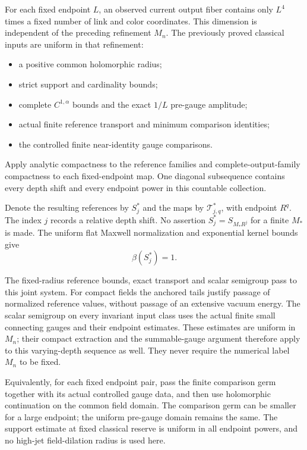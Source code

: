 For each fixed endpoint \(L\), an observed current output
fiber contains only \(L^4\) times a fixed number of link
and color coordinates. This dimension is independent of
the preceding refinement \(M_n\). The previously proved
classical inputs are uniform in that refinement:
\begin{itemize}
 \item a positive common holomorphic radius;
 \item strict support and cardinality bounds;
 \item complete \(C^{1,\alpha}\) bounds and the exact
       \(1/L\) pre-gauge amplitude;
 \item actual finite reference transport and minimum
       comparison identities;
 \item the controlled finite near-identity gauge comparisons.
\end{itemize}
Apply analytic compactness to the reference families and
complete-output-family compactness to each fixed-endpoint
map. One diagonal subsequence contains every depth shift
and every endpoint power in this countable collection.

Denote the resulting references by \(S_j^*\) and the maps
by \(\mathcal T_{j,q}^*\), with endpoint \(R^q\). The index
\(j\) records a relative depth shift. No assertion
\(S_j^*=S_{M_*R^j}\) for a finite \(M_*\) is made.
The uniform flat Maxwell normalization and exponential
kernel bounds give
\begin{equation}
                           \beta(S_j^*)=1.
 \label{fml-reference-normalization}
\end{equation}

The fixed-radius reference bounds, exact transport and
scalar semigroup pass to this joint system. For compact
fields the anchored tails justify passage of normalized
reference values, without passage of an extensive vacuum
energy. The scalar semigroup on every invariant input
class uses the actual finite small connecting gauges
and their endpoint estimates. These estimates are uniform
in \(M_n\); their compact extraction and the summable-gauge
argument therefore apply to this varying-depth sequence
as well. They never require the numerical label \(M_n\)
to be fixed.

Equivalently, for each fixed endpoint pair, pass the finite
comparison germ together with its actual controlled gauge
data, and then use holomorphic continuation on the
common field domain. The comparison germ can be smaller
for a large endpoint; the uniform pre-gauge domain remains
the same. The support estimate at fixed classical reserve
is uniform in all endpoint powers, and no high-jet
field-dilation radius is used here.

